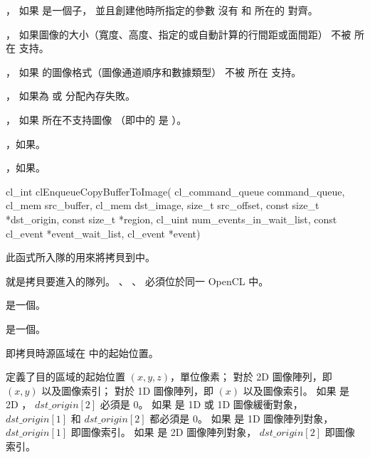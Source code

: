 \item {}，
如果  是一個子，
並且創建他時所指定的參數  沒有
和  所在的  對齊。

\item {}，
如果圖像的大小（寬度、高度、指定的或自動計算的行間距或面間距）
不被  所在 支持。

\item {}，
如果  的圖像格式（圖像通道順序和數據類型）
不被  所在 支持。

\item {}，
如果為  或  分配內存失敗。

\item {}，
如果  所在不支持圖像
（即中的  是 ）。

\item {}，如果\scdevfailres。
\item {}，如果\schostfailres。
\stopigBase


\startCLFUNC
cl_int clEnqueueCopyBufferToImage(
			cl_command_queue command_queue,
			cl_mem src_buffer,
			cl_mem dst_image,
			size_t src_offset,
			const size_t *dst_origin,
			const size_t *region,
			cl_uint num_events_in_wait_list,
			const cl_event *event_wait_list,
			cl_event *event)
\stopCLFUNC

此函式所入隊的用來將拷貝到中。

 就是拷貝要進入的隊列。
、 、 
必須位於同一 OpenCL 中。

 是一個。

 是一個。

 即拷貝時源區域在  中的起始位置。

 定義了目的區域的起始位置 $(x, y, z)$，單位像素；
對於 2D 圖像陣列，即 $(x, y)$ 以及圖像索引；
對於 1D 圖像陣列，即 $(x)$ 以及圖像索引。
如果  是 2D ， $dst\_origin[2]$ 必須是 0。
如果  是 1D 或 1D 圖像緩衝對象，
$dst\_origin[1]$ 和 $dst\_origin[2]$ 都必須是 0。
如果  是 1D 圖像陣列對象， $dst\_origin[1]$ 即圖像索引。
如果  是 2D 圖像陣列對象， $dst\_origin[2]$ 即圖像索引。

